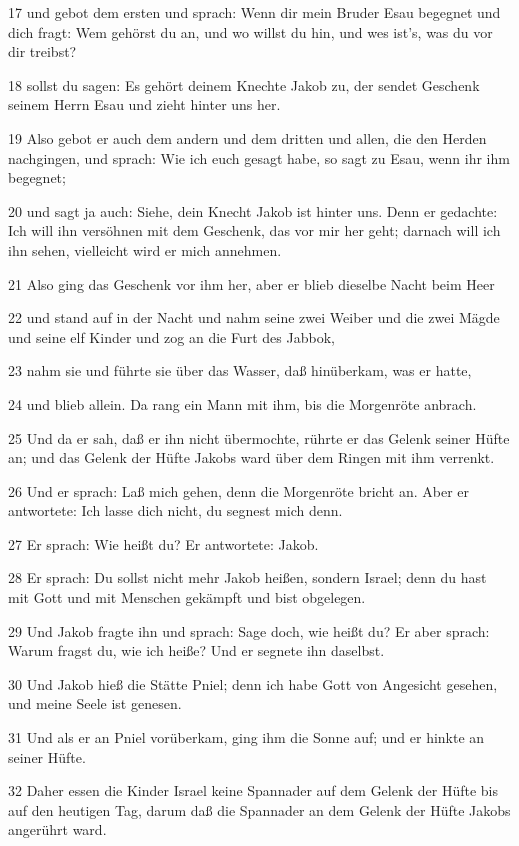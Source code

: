 \par 17 und gebot dem ersten und sprach: Wenn dir mein Bruder Esau begegnet und dich fragt: Wem gehörst du an, und wo willst du hin, und wes ist's, was du vor dir treibst?
\par 18 sollst du sagen: Es gehört deinem Knechte Jakob zu, der sendet Geschenk seinem Herrn Esau und zieht hinter uns her.
\par 19 Also gebot er auch dem andern und dem dritten und allen, die den Herden nachgingen, und sprach: Wie ich euch gesagt habe, so sagt zu Esau, wenn ihr ihm begegnet;
\par 20 und sagt ja auch: Siehe, dein Knecht Jakob ist hinter uns. Denn er gedachte: Ich will ihn versöhnen mit dem Geschenk, das vor mir her geht; darnach will ich ihn sehen, vielleicht wird er mich annehmen.
\par 21 Also ging das Geschenk vor ihm her, aber er blieb dieselbe Nacht beim Heer
\par 22 und stand auf in der Nacht und nahm seine zwei Weiber und die zwei Mägde und seine elf Kinder und zog an die Furt des Jabbok,
\par 23 nahm sie und führte sie über das Wasser, daß hinüberkam, was er hatte,
\par 24 und blieb allein. Da rang ein Mann mit ihm, bis die Morgenröte anbrach.
\par 25 Und da er sah, daß er ihn nicht übermochte, rührte er das Gelenk seiner Hüfte an; und das Gelenk der Hüfte Jakobs ward über dem Ringen mit ihm verrenkt.
\par 26 Und er sprach: Laß mich gehen, denn die Morgenröte bricht an. Aber er antwortete: Ich lasse dich nicht, du segnest mich denn.
\par 27 Er sprach: Wie heißt du? Er antwortete: Jakob.
\par 28 Er sprach: Du sollst nicht mehr Jakob heißen, sondern Israel; denn du hast mit Gott und mit Menschen gekämpft und bist obgelegen.
\par 29 Und Jakob fragte ihn und sprach: Sage doch, wie heißt du? Er aber sprach: Warum fragst du, wie ich heiße? Und er segnete ihn daselbst.
\par 30 Und Jakob hieß die Stätte Pniel; denn ich habe Gott von Angesicht gesehen, und meine Seele ist genesen.
\par 31 Und als er an Pniel vorüberkam, ging ihm die Sonne auf; und er hinkte an seiner Hüfte.
\par 32 Daher essen die Kinder Israel keine Spannader auf dem Gelenk der Hüfte bis auf den heutigen Tag, darum daß die Spannader an dem Gelenk der Hüfte Jakobs angerührt ward.


